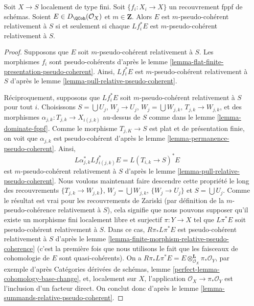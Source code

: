 \begin{lemma}
\label{lemma-relative-pseudo-coherent-descends-fppf}
Soit $X \to S$ localement de type fini.
Soit $\{f_i : X_i \to X\}$ un recouvrement fppf de schémas.
Soient $E \in D_\QCoh(\mathcal{O}_X)$ et $m \in \mathbf{Z}$.
Alors $E$ est $m$-pseudo-cohérent relativement à $S$
si et seulement si chaque $Lf_i^*E$ est $m$-pseudo-cohérent relativement à $S$.
\end{lemma}

\begin{proof}
Supposons que $E$ soit $m$-pseudo-cohérent relativement à $S$.
Les morphismes $f_i$ sont pseudo-cohérents d'après le
lemme \ref{lemma-flat-finite-presentation-pseudo-coherent}.
Ainsi, $Lf_i^*E$ est $m$-pseudo-cohérent relativement à $S$
d'après le lemme \ref{lemma-pull-relative-pseudo-coherent}.

\medskip\noindent
Réciproquement, supposons que $Lf_i^*E$ soit $m$-pseudo-cohérent relativement à $S$
pour tout $i$. Choisissons $S = \bigcup U_j$, $W_j \to U_j$,
$W_j = \bigcup W_{j, k}$, $T_{j, k} \to W_{j, k}$, et des
morphismes $\alpha_{j, k} : T_{j, k} \to X_{i(j, k)}$ au-dessus de $S$ comme dans le
lemme \ref{lemma-dominate-fppf}.
Comme le morphisme $T_{j, K} \to S$ est plat et de présentation finie,
on voit que $\alpha_{j, k}$ est pseudo-cohérent d'après le
lemme \ref{lemma-permanence-pseudo-coherent}.
Ainsi,
$$
L\alpha_{j, k}^*Lf_{i(j, k)}^*E = L(T_{i, k} \to S)^*E
$$
est $m$-pseudo-cohérent relativement à $S$ d'après le
lemme \ref{lemma-pull-relative-pseudo-coherent}.
Nous voulons maintenant faire descendre cette propriété
le long des recouvrements $\{T_{j, k} \to W_{j, k}\}$,
$W_j = \bigcup W_{j, k}$, $\{W_j \to U_j\}$ et $S = \bigcup U_j$.
Comme le résultat est vrai pour les recouvrements de Zariski
(par définition de la $m$-pseudo-cohérence relativement à $S$),
cela signifie que nous pouvons supposer qu'il existe un morphisme
fini localement libre et surjectif $\pi : Y \to X$
tel que $L\pi^*E$ soit pseudo-cohérent relativement à $S$.
Dans ce cas, $R\pi_*L\pi^*E$ est pseudo-cohérent relativement à $S$
d'après le lemme \ref{lemma-finite-morphism-relative-pseudo-coherence}
(c'est la première fois que nous utilisons le fait que les faisceaux de cohomologie de $E$ sont quasi-cohérents).
On a
$R\pi_*L\pi^*E = E \otimes^\mathbf{L}_{\mathcal{O}_X} \pi_*\mathcal{O}_Y$,
par exemple d'après
Catégories dérivées de schémas, lemme
\ref{perfect-lemma-cohomology-base-change},
et, localement sur $X$, l'application $\mathcal{O}_X \to \pi_*\mathcal{O}_Y$
est l'inclusion d'un facteur direct. On conclut donc d'après le
lemme \ref{lemma-summands-relative-pseudo-coherent}.
\end{proof}

